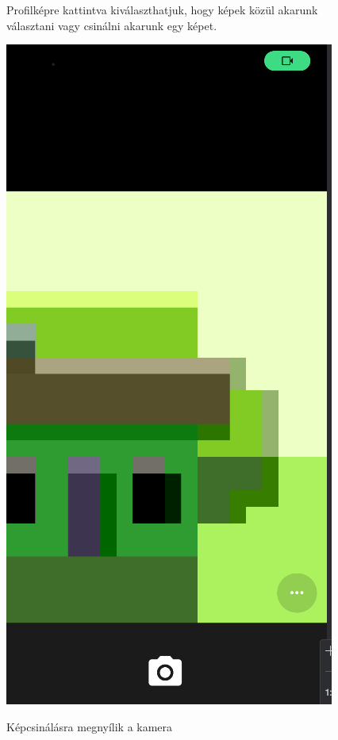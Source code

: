 \documentclass[12pt]{report}
\begin{document}
\begin{figure}[H]
\begin{minipage}[b]{0.3\textwidth}
        \par
        \footnotesize Profilképre kattintva kiválaszthatjuk, hogy képek közül akarunk választani vagy csinálni akarunk egy képet.
    \end{minipage}
    \hfill
    \begin{minipage}[b]{0.3\textwidth}
        \centering
        \includegraphics[width=\linewidth]{src/profilepic2.png}
        \par
        \footnotesize Képcsinálásra megnyílik a kamera
    \end{minipage}

\end{figure}
\end{document}
